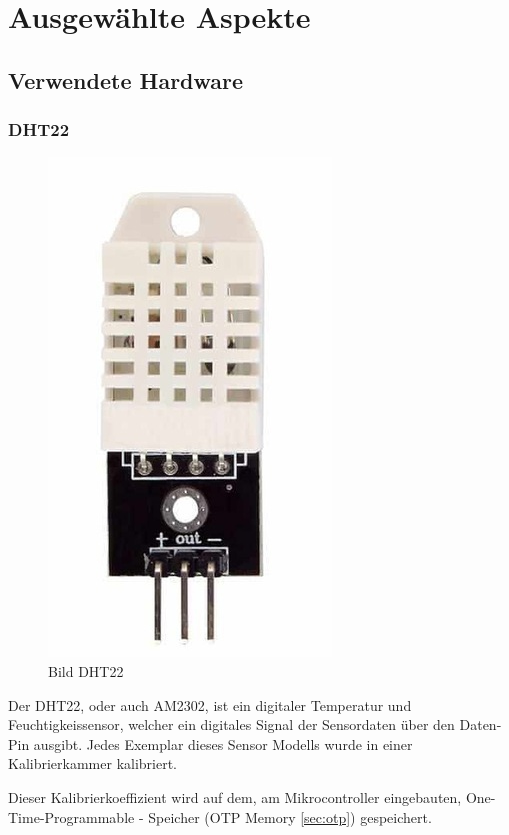\chapter{Ausgewählte Aspekte}

\section{Verwendete Hardware}

\subsection{DHT22}

\begin{figure}[H]
    \begin{center}
        \includegraphics[scale=1]{images/dht22.png}
        \caption{Bild DHT22 \cite{dht22_picture}}
    \end{center}    
\end{figure}

Der DHT22, oder auch AM2302, ist ein digitaler Temperatur und Feuchtigkeissensor, welcher ein digitales Signal der Sensordaten über den Daten-Pin ausgibt. Jedes Exemplar dieses Sensor Modells wurde in einer Kalibrierkammer kalibriert. 

Dieser Kalibrierkoeffizient wird auf dem, am Mikrocontroller eingebauten, One-Time-Programmable - Speicher (OTP Memory \ref{sec:otp}) gespeichert.

